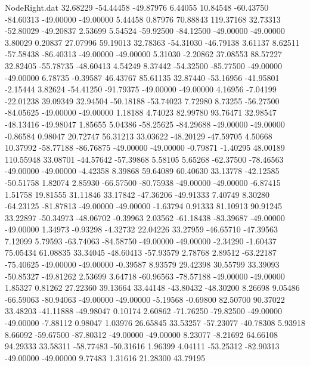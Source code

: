 \begin{filecontents}{NodeRight.dat}
  32.68229  -54.44458  -49.87976     6.44055   10.84548  -60.43750  -84.60313  -49.00000  -49.00000    5.44458    0.87976   70.88843  119.37168
  32.73313  -52.80029  -49.20837     2.53699    5.54524  -59.92500  -84.12500  -49.00000  -49.00000    3.80029    0.20837   27.07996   59.19013
  32.78363  -54.31030  -46.79138     3.61137    8.62511  -57.58438  -86.40313  -49.00000  -49.00000    5.31030   -2.20862   37.08553   88.57227
  32.82405  -55.78735  -48.60413     4.54249    8.37442  -54.32500  -85.77500  -49.00000  -49.00000    6.78735   -0.39587   46.43767   85.61135
  32.87440  -53.16956  -41.95801    -2.15444    3.82624  -54.41250  -91.79375  -49.00000  -49.00000    4.16956   -7.04199  -22.01238   39.09349
  32.94504  -50.18188  -53.74023     7.72980    8.73255  -56.27500  -84.05625  -49.00000  -49.00000    1.18188    4.74023   82.99780   93.76471
  32.98547  -48.13416  -49.98047     1.85655    5.04386  -58.25625  -84.29688  -49.00000  -49.00000   -0.86584    0.98047   20.72747   56.31213
  33.03622  -48.20129  -47.59705     4.50668   10.37992  -58.77188  -86.76875  -49.00000  -49.00000   -0.79871   -1.40295   48.00189  110.55948
  33.08701  -44.57642  -57.39868     5.58105    5.65268  -62.37500  -78.46563  -49.00000  -49.00000   -4.42358    8.39868   59.64089   60.40630
  33.13778  -42.12585  -50.51758     1.82074    2.85930  -66.57500  -80.75938  -49.00000  -49.00000   -6.87415    1.51758   19.81555   31.11846
  33.17842  -47.36206  -49.91333     7.40749    8.30280  -64.23125  -81.87813  -49.00000  -49.00000   -1.63794    0.91333   81.10913   90.91245
  33.22897  -50.34973  -48.06702    -0.39963    2.03562  -61.18438  -83.39687  -49.00000  -49.00000    1.34973   -0.93298   -4.32732   22.04226
  33.27959  -46.65710  -47.39563     7.12099    5.79593  -63.74063  -84.58750  -49.00000  -49.00000   -2.34290   -1.60437   75.05434   61.08835
  33.34045  -48.60413  -57.93579     2.78768    2.89512  -63.22187  -75.40625  -49.00000  -49.00000   -0.39587    8.93579   29.42398   30.55799
  33.39093  -50.85327  -49.81262     2.53699    3.64718  -60.96563  -78.57188  -49.00000  -49.00000    1.85327    0.81262   27.22360   39.13664
  33.44148  -43.80432  -48.30200     8.26698    9.05486  -66.59063  -80.94063  -49.00000  -49.00000   -5.19568   -0.69800   82.50700   90.37022
  33.48203  -41.11888  -49.98047     0.10174    2.60862  -71.76250  -79.82500  -49.00000  -49.00000   -7.88112    0.98047    1.03976   26.65845
  33.53257  -57.23077  -40.78308     5.93918    8.66092  -59.67500  -87.80312  -49.00000  -49.00000    8.23077   -8.21692   64.66108   94.29333
  33.58311  -58.77483  -50.31616     1.96399    4.04111  -53.25312  -82.90313  -49.00000  -49.00000    9.77483    1.31616   21.28300   43.79195

\end{filecontents}
